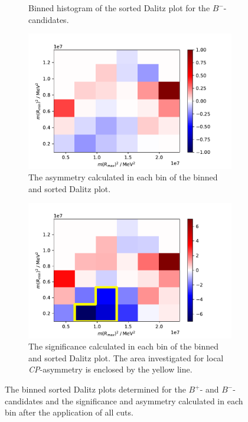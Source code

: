 \begin{figure}[H]
\begin{subfigure}{0.49\textwidth}
    \caption{Binned histogram of the sorted Dalitz plot for the $B^-$-candidates.}
    \label{f7b}
  \end{subfigure}
  \begin{subfigure}{0.49\textwidth}
    \includegraphics[width=\textwidth]{plots/Dalitz_sorted_Asym.pdf}
    \caption{The asymmetry calculated in each bin of the binned and sorted Dalitz plot.}
    \label{f7c}
  \end{subfigure}
  \begin{subfigure}{0.49\textwidth}
    \includegraphics[width=\textwidth]{plots/Dalitz_sorted_bin_cut_sig.pdf}
    \caption{The significance calculated in each bin of the binned and sorted Dalitz plot.
    The area investigated for local \textit{CP}-asymmetry is enclosed by the yellow line.}
    \label{f7d}
  \end{subfigure}
  \caption{The binned sorted Dalitz plots determined for the $B^+$- and $B^-$-candidates and the significance and asymmetry calculated in each bin after the application
  of all cuts.}
  \label{f7}
\end{figure}

